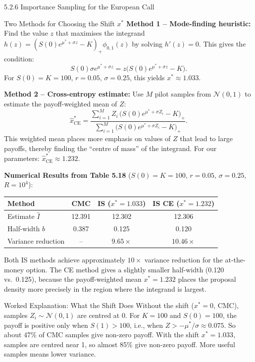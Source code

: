 \documentclass[aspectratio=169,10pt]{beamer}
\begin{document}
\begin{frame}[allowframebreaks]{5.2.6 Importance Sampling for the European Call}
\begin{block}{Two Methods for Choosing the Shift $x^*$}
  \textbf{Method 1 -- Mode-finding heuristic:}
  Find the value $z$ that maximises the integrand
  $h(z) = (S(0)e^{\mu^*+\sigma z}-K)_+\phi_{0,1}(z)$ by solving $h'(z) = 0$.
  This gives the condition:
  \[
    S(0)\sigma e^{\mu^*+\sigma z} = z\bigl(S(0)e^{\mu^*+\sigma z}-K\bigr).
  \]
  For $S(0)=K=100$, $r=0.05$, $\sigma=0.25$, this yields $x^* \approx 1.033$.

  \medskip
  \textbf{Method 2 -- Cross-entropy estimate:}
  Use $M$ pilot samples from $\mathcal{N}(0,1)$ to estimate the payoff-weighted
  mean of $Z$:
  \[
    \hat{x}^*_{\mathrm{CE}} =
    \frac{\sum_{i=1}^M Z_i\,\bigl(S(0)e^{\mu^*+\sigma Z_i}-K\bigr)_+}
         {\sum_{i=1}^M \bigl(S(0)e^{\mu^*+\sigma Z_i}-K\bigr)_+}.
  \]
  This weighted mean places more emphasis on values of $Z$ that lead to large
  payoffs, thereby finding the ``centre of mass'' of the integrand.
  For our parameters: $\hat{x}^*_{\mathrm{CE}} \approx 1.232$.
\end{block}

\framebreak

\textbf{Numerical Results from Table 5.18}
($S(0) = K = 100$, $r = 0.05$, $\sigma = 0.25$, $R = 10^4$):

\begin{center}\small
  \begin{tabular}{lccc}
    \toprule
    Method                     & CMC    & IS ($x^* = 1.033$) & IS CE ($x^* = 1.232$) \\
    \midrule
    Estimate $\hat{I}$         & 12.391 & 12.302             & 12.306                \\
    Half-width $b$             & 0.387  & 0.125              & 0.120                 \\
    Variance reduction         & --     & $9.65\times$       & $10.46\times$         \\
    \bottomrule
  \end{tabular}
\end{center}

Both IS methods achieve approximately $10\times$ variance reduction for the
at-the-money option.  The CE method gives a slightly smaller half-width
(0.120 vs.\ 0.125), because the payoff-weighted mean $x^* = 1.232$ places
the proposal density more precisely in the region where the integrand is largest.

\begin{exampleblock}{Worked Explanation: What the Shift Does}
  Without the shift ($x^* = 0$, CMC), samples $Z_i \sim \mathcal{N}(0, 1)$
  are centred at 0.  For $K = 100$ and $S(0) = 100$, the payoff is positive
  only when $S(1) > 100$, i.e., when $Z > -\mu^*/\sigma \approx 0.075$.
  So about 47\% of CMC samples give non-zero payoff.  With the shift $x^* = 1.033$,
  samples are centred near 1, so almost 85\% give non-zero payoff.  More useful
  samples means lower variance.


\end{exampleblock}
\end{frame}
\end{document}

